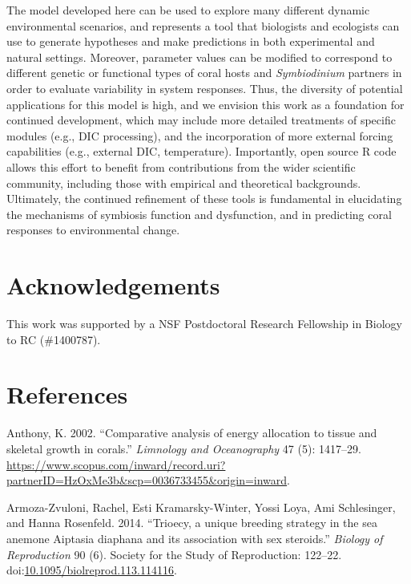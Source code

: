 \documentclass[]{elsarticle} %
\begin{document}
The model developed here can be used to explore many different dynamic
environmental scenarios, and represents a tool that biologists and
ecologists can use to generate hypotheses and make predictions in both
experimental and natural settings. Moreover, parameter values can be
modified to correspond to different genetic or functional types of coral
hosts and \emph{Symbiodinium} partners in order to evaluate variability
in system responses. Thus, the diversity of potential applications for
this model is high, and we envision this work as a foundation for
continued development, which may include more detailed treatments of
specific modules (e.g., DIC processing), and the incorporation of more
external forcing capabilities (e.g., external DIC, temperature).
Importantly, open source R code allows this effort to benefit from
contributions from the wider scientific community, including those with
empirical and theoretical backgrounds. Ultimately, the continued
refinement of these tools is fundamental in elucidating the mechanisms
of symbiosis function and dysfunction, and in predicting coral responses
to environmental change.

\section{Acknowledgements}\label{acknowledgements}

This work was supported by a NSF Postdoctoral Research Fellowship in
Biology to RC (\#1400787).

\section*{References}\label{references}

\hypertarget{refs}{}
\hypertarget{ref-Anthony:2002tc}{}
Anthony, K. 2002. ``Comparative analysis of energy allocation to tissue
and skeletal growth in corals.'' \emph{Limnology and Oceanography} 47
(5): 1417--29.
\url{https://www.scopus.com/inward/record.uri?partnerID=HzOxMe3b\&scp=0036733455\&origin=inward}.

\hypertarget{ref-ArmozaZvuloni:2014ju}{}
Armoza-Zvuloni, Rachel, Esti Kramarsky-Winter, Yossi Loya, Ami
Schlesinger, and Hanna Rosenfeld. 2014. ``Trioecy, a unique breeding
strategy in the sea anemone Aiptasia diaphana and its association with
sex steroids.'' \emph{Biology of Reproduction} 90 (6). Society for the
Study of Reproduction: 122--22.
doi:\href{https://doi.org/10.1095/biolreprod.113.114116}{10.1095/biolreprod.113.114116}.
\end{document}
